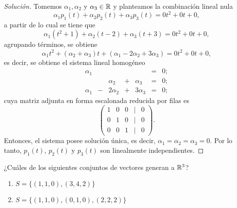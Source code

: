 \documentclass[a4,11pt]{aleph-notas}
\begin{document}
\begin{proof}[Solución]\hspace{0pt}
    Tomemos $\alpha_1, \alpha_2$ y $\alpha_3\in\mathbb{R}$ y planteamos la combinación lineal nula
    \[
        \alpha_1 p_1(t) + \alpha_2 p_2(t) + \alpha_3 p_3(t) = 0t^2 + 0t + 0,
    \]
    a partir de lo cual se tiene que
    \[
        \alpha_1(t^2 + 1) + \alpha_2(t - 2) + \alpha_3(t + 3) = 0t^2 + 0t + 0,
    \]
    agrupando términos, se obtiene
    \[
        \alpha_1t^2 + (\alpha_2 + \alpha_3)t + (\alpha_1 - 2\alpha_2 + 3\alpha_3) = 0t^2 + 0t + 0,
    \]
    es decir, se obtiene el sistema lineal homogéneo
    \[
        \begin{array}{ccccccc}
            \alpha_1 &  &  &  & & = & 0;\\
             &  & \alpha_2 & + & \alpha_3& = & 0;\\
            \alpha_1 & - & 2\alpha_2 & + & 3\alpha_3& = & 0;
        \end{array}
    \]
    cuya matriz adjunta en forma escalonada reducida por filas es
    \[
        \begin{pmatrix}
            1 & 0 & 0 & | & 0\\
            0 & 1 & 0 & | & 0\\
            0 & 0 & 1 & | & 0
        \end{pmatrix}.
    \]
    Entonces, el sistema posee solución única, es decir, $\alpha_1 = \alpha_2 = \alpha_3 = 0$. Por lo tanto, $p_1(t)$, $p_2(t)$ y $p_3(t)$ son linealmente independientes.
\end{proof}

\begin{ejer}
    ¿Cuáles de los siguientes conjuntos de vectores generan a $\mathbb{R}^3$?
\begin{enumerate}
        \item $S=\{(1, 1, 0), (3, 4, 2)\}$
        \item $S=\{(1, 1, 0), (0, 1, 0), (2, 2, 2)\}$
\end{enumerate}
\end{ejer}
\end{document}
